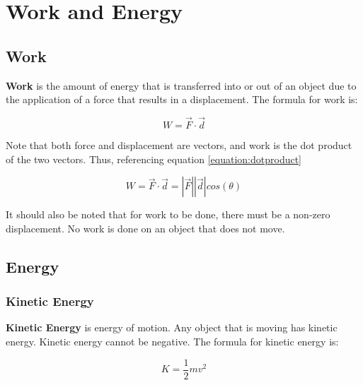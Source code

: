 \chapter{Work and Energy}
	\section{Work} 
	\textbf{Work} is the amount of energy that is transferred into or out of an object due to the application of a force that results in a displacement.  The formula for work is:
		
		\begin{mdframed}[backgroundcolor=orange!20!white]
		\begin{equation}
		W = \vec{F}\cdot\vec{d}  
		\label{eqn:work}
		\end{equation}
	\end{mdframed}
	
	Note that both force and displacement are vectors, and work is the dot product of the two vectors.  Thus, referencing equation \ref{equation:dotproduct}
	\begin{mdframed}[backgroundcolor=orange!20!white]
	\begin{equation}
		W = \vec{F}\cdot\vec{d}  = |\vec{F}| |\vec{d}| cos (\theta)
		\label{eqn:workdotproduct}
	\end{equation}
\end{mdframed}	
	It should also be noted that for work to be done, there must be a non-zero displacement.  No work is done on an object that does not move.  
	
	
	\section{Energy}
	\subsection{Kinetic Energy}  \label{Kinetic Energy} 
	\textbf{Kinetic Energy} is energy of motion.  Any object that is moving has kinetic energy.  Kinetic energy cannot be negative.  The formula for kinetic energy is: 
		\begin{mdframed}[backgroundcolor=orange!20!white]
		\begin{equation}
		K = \frac{1}{2}mv^2 
		\label{eqn:kineticenergy}
		\end{equation}
	\end{mdframed}
	
